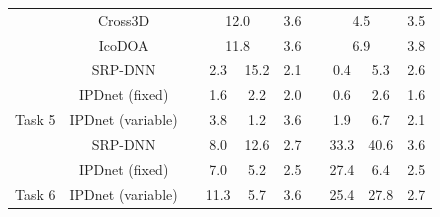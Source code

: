 \documentclass[lettersize,journal]{IEEEtran}
\begin{document}
\begin{table}[]
\begin{tabular}{cclccclccc}
                                                                          & Cross3D                                &  & \multicolumn{2}{c}{12.0}                                                    & 3.6                                   &  & \multicolumn{2}{c}{4.5}                                                       & 3.5                                  \\
                                                                          & IcoDOA                                 &  & \multicolumn{2}{c}{11.8}                                                    & 3.6                                   &  & \multicolumn{2}{c}{6.9}                                                       & 3.8                                  \\
                                                                          & SRP-DNN                                &  & 2.3                                  & 15.2                                 & 2.1                                   &  & 0.4                          & 5.3                                   & 2.6                                  \\
                                                                          & \cellcolor[HTML]{EFEFEF}IPDnet (fixed)&  & \cellcolor[HTML]{EFEFEF}1.6 & \cellcolor[HTML]{EFEFEF}2.2          & \cellcolor[HTML]{EFEFEF}2.0  &  & \cellcolor[HTML]{EFEFEF}0.6           & \cellcolor[HTML]{EFEFEF}2.6  & \cellcolor[HTML]{EFEFEF}1.6 \\
\multirow{-5}{*}{Task 5}                                                  & \cellcolor[HTML]{EFEFEF}IPDnet (variable)&  & \cellcolor[HTML]{EFEFEF}3.8          & \cellcolor[HTML]{EFEFEF}1.2 & \cellcolor[HTML]{EFEFEF}3.6           &  & \cellcolor[HTML]{EFEFEF}1.9           & \cellcolor[HTML]{EFEFEF}6.7           & \cellcolor[HTML]{EFEFEF}2.1          \\ \midrule
                                                                          & SRP-DNN                                &  & 8.0                                  & 12.6                                 & 2.7                                   &  & 33.3                                  & 40.6                                  & 3.6                                  \\
                                                                          & \cellcolor[HTML]{EFEFEF}IPDnet (fixed)&  & \cellcolor[HTML]{EFEFEF}7.0 & \cellcolor[HTML]{EFEFEF}5.2 & \cellcolor[HTML]{EFEFEF}2.5  &  & \cellcolor[HTML]{EFEFEF}27.4          & \cellcolor[HTML]{EFEFEF}6.4 & \cellcolor[HTML]{EFEFEF}2.5 \\
\multirow{-3}{*}{Task 6}                                                  & \cellcolor[HTML]{EFEFEF}IPDnet (variable)&  & \cellcolor[HTML]{EFEFEF}11.3         & \cellcolor[HTML]{EFEFEF}5.7          & \cellcolor[HTML]{EFEFEF}3.6           &  & \cellcolor[HTML]{EFEFEF}25.4 & \cellcolor[HTML]{EFEFEF}27.8          & \cellcolor[HTML]{EFEFEF}2.7          \\ \midrule \midrule
                                                                       

\end{tabular}
\end{table}
\end{document}
